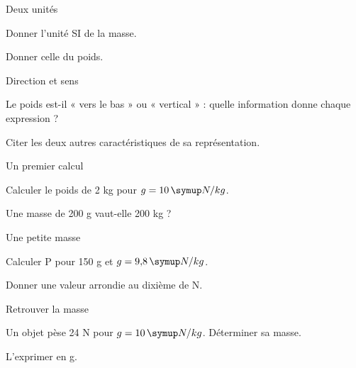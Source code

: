 \par\noindent\begin{minipage}{\linewidth}
\begin{exercice}[1]{Deux unités}
\begin{questions}
\item Donner l’unité SI de la masse.
\item Donner celle du poids.
\end{questions}
\end{exercice}
\end{minipage}
\par\noindent\begin{minipage}{\linewidth}
\begin{exercice}[1]{Direction et sens}
\begin{questions}
\item Le poids est-il « vers le bas » ou « vertical » : quelle information donne chaque expression ?
\item Citer les deux autres caractéristiques de sa représentation.
\end{questions}
\end{exercice}
\end{minipage}
\par\noindent\begin{minipage}{\linewidth}
\begin{exercice}[1]{Un premier calcul}
\begin{questions}
\item Calculer le poids de 2 kg pour $g=10\unite{N/kg}$.
\item Une masse de 200 g vaut-elle 200 kg ?
\end{questions}
\end{exercice}
\end{minipage}
\clearpage{}
\par\noindent\begin{minipage}{\linewidth}
\begin{exercice}[2]{Une petite masse}
\begin{questions}
\item Calculer P pour 150 g et $g=9{,}8\unite{N/kg}$.
\item Donner une valeur arrondie au dixième de N.
\end{questions}
\end{exercice}
\end{minipage}
\par\noindent\begin{minipage}{\linewidth}
\begin{exercice}[2]{Retrouver la masse}
\begin{questions}
\item Un objet pèse 24 N pour $g=10\unite{N/kg}$. Déterminer sa masse.
\item L’exprimer en g.
\end{questions}
\end{exercice}
\end{minipage}
